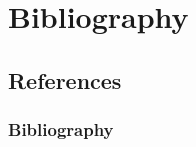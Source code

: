 \documentclass[]{beamer}
\begin{document}
	
	
	
	

\section{Bibliography}
\subsection{References}
\begin{frame}[t,allowframebreaks]
\frametitle{Bibliography}
\nocite{*}
\printbibliography[heading=none]
\end{frame}
\end{document}
